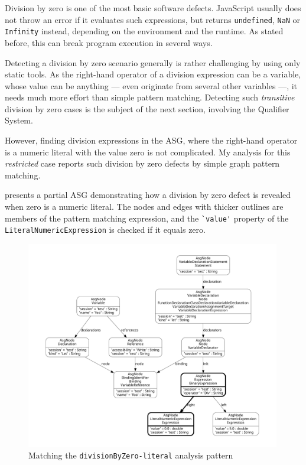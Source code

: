 Division by zero is one of the most basic software defects. JavaScript usually does not throw an error if it evaluates such expressions, but returns \lstinline{undefined}, \lstinline{NaN} or \lstinline{Infinity} instead, depending on the environment and the runtime. As stated before, this can break program execution in several ways.

Detecting a division by zero scenario generally is rather challenging by using only static tools. As the right-hand operator of a division expression can be a variable, whose value can be anything — even originate from several other variables —, it needs much more effort than simple pattern matching. Detecting such \emph{transitive} division by zero cases is the subject of the next section, involving the Qualifier System.

However, finding division expressions in the ASG, where the right-hand operator is a numeric literal with the value zero is not complicated. My analysis for this \emph{restricted} case reports such division by zero defects by simple graph pattern matching.

 presents a partial ASG demonstrating how a division by zero defect is revealed when zero is a numeric literal. The nodes and edges with thicker outlines are members of the pattern matching expression, and the \lstinline{`value'} property of the \lstinline{LiteralNumericExpression} is checked if it equals zero.

\begin{figure}[!htb]
	\centering
	\includegraphics[height=91mm, trim=12mm 12mm 12mm 12mm,clip]{figures/analysis_divisionByZero_simple.pdf}
	\caption{Matching the \lstinline{divisionByZero-literal} analysis pattern}
	\label{fig:analysis-divisionbyzero-simple}
\end{figure}


